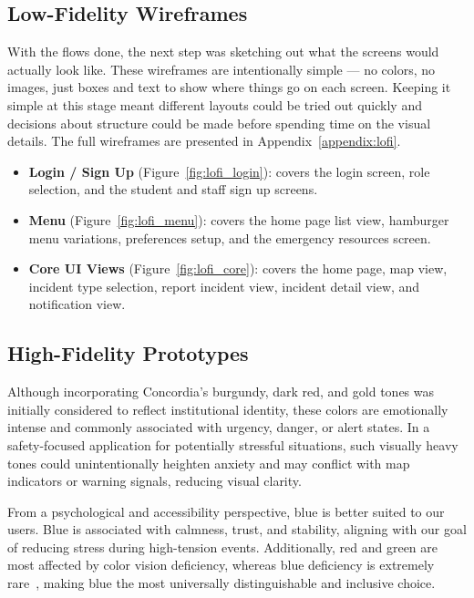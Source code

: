 \documentclass[sigconf]{acmart}
\begin{document}
\subsection{Low-Fidelity Wireframes}
 
With the flows done, the next step was sketching out what the screens would actually look like. These wireframes are intentionally simple --- no colors, no images, just boxes and text to show where things go on each screen. Keeping it simple at this stage meant different layouts could be tried out quickly and decisions about structure could be made before spending time on the visual details. The full wireframes are presented in Appendix~\ref{appendix:lofi}.
 
\begin{itemize}[leftmargin=*, labelindent=0pt, itemsep=4pt]
    \item \textbf{Login / Sign Up} (Figure~\ref{fig:lofi_login}): covers the login screen, role selection, and the student and staff sign up screens.
    \item \textbf{Menu} (Figure~\ref{fig:lofi_menu}): covers the home page list view, hamburger menu variations, preferences setup, and the emergency resources screen.
    \item \textbf{Core UI Views} (Figure~\ref{fig:lofi_core}): covers the home page, map view, incident type selection, report incident view, incident detail view, and notification view.
\end{itemize}
 
\subsection{High-Fidelity Prototypes}
 
Although incorporating Concordia's burgundy, dark red, and gold tones was initially considered to reflect institutional identity, these colors are emotionally intense and commonly associated with urgency, danger, or alert states. In a safety-focused application for potentially stressful situations, such visually heavy tones could unintentionally heighten anxiety and may conflict with map indicators or warning signals, reducing visual clarity.
 
From a psychological and accessibility perspective, blue is better suited to our users. Blue is associated with calmness, trust, and stability, aligning with our goal of reducing stress during high-tension events. Additionally, red and green are most affected by color vision deficiency, whereas blue deficiency is extremely rare~\cite{birch1993practical}, making blue the most universally distinguishable and inclusive choice.
 
\end{document}
